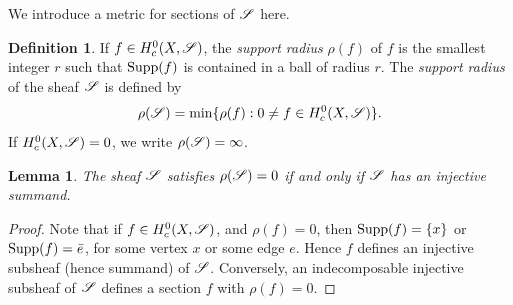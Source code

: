 \documentclass[letter]{amsart}
\newtheorem{lemma}[thm]{Lemma}
\theoremstyle{definition}
\newtheorem{definition}[thm]{Definition}
\theoremstyle{remark}
\numberwithin{thm}{section}
\numberwithin{equation}{section}
\begin{document}
We introduce a metric for sections of ${\mathscr{S}}$ here.
\begin{definition}
If $f \in H_c^0(X, {\mathscr{S}})$, the {\em support radius} $\rho(f)$ of $f$ is the smallest integer $r$ such that $\operatorname{Supp}(f)$ is contained in a ball of radius $r$.  The {\em support radius} of the sheaf ${\mathscr{S}}$ is defined by
$$\rho({\mathscr{S}}) = \min \{ \rho(f) : 0 \neq f \in H_c^0(X, {\mathscr{S}}) \}.$$
If $H_c^0(X, {\mathscr{S}}) = 0$, we write $\rho({\mathscr{S}}) = \infty$.
\end{definition}

\begin{lemma}
\label{rho-inj}
The sheaf ${\mathscr{S}}$ satisfies $\rho({\mathscr{S}}) = 0$ if and only if ${\mathscr{S}}$ has an injective summand.
\end{lemma}
\begin{proof}
Note that if $f \in H_c^0(X, {\mathscr{S}})$, and $\rho(f) = 0$, then $\operatorname{Supp}(f) = \{ x \}$ or $\operatorname{Supp}(f) = \bar e$, for some vertex $x$ or some edge $e$.  Hence $f$ defines an injective subsheaf (hence summand) of ${\mathscr{S}}$.  Conversely, an indecomposable injective subsheaf of ${\mathscr{S}}$ defines a section $f$ with $\rho(f) = 0$.
\end{proof}
\end{document}
